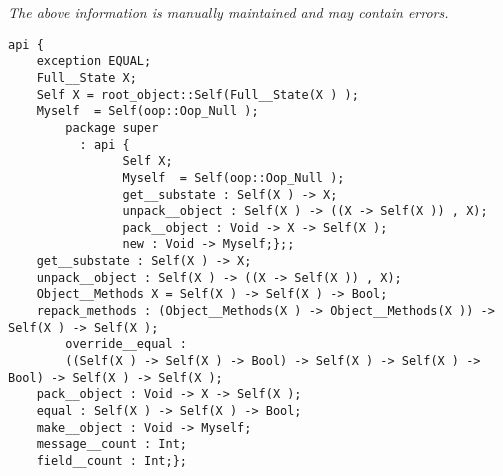 \label{api:Object2}

{\tiny \it The above information is manually maintained and may contain errors.}
\begin{verbatim}
api {
    exception EQUAL;
    Full__State X;
    Self X = root_object::Self(Full__State(X ) );
    Myself  = Self(oop::Oop_Null );
        package super
          : api {
                Self X;
                Myself  = Self(oop::Oop_Null );
                get__substate : Self(X ) -> X;
                unpack__object : Self(X ) -> ((X -> Self(X )) , X);
                pack__object : Void -> X -> Self(X );
                new : Void -> Myself;};;
    get__substate : Self(X ) -> X;
    unpack__object : Self(X ) -> ((X -> Self(X )) , X);
    Object__Methods X = Self(X ) -> Self(X ) -> Bool;
    repack_methods : (Object__Methods(X ) -> Object__Methods(X )) -> Self(X ) -> Self(X );
        override__equal :
        ((Self(X ) -> Self(X ) -> Bool) -> Self(X ) -> Self(X ) -> Bool) -> Self(X ) -> Self(X );
    pack__object : Void -> X -> Self(X );
    equal : Self(X ) -> Self(X ) -> Bool;
    make__object : Void -> Myself;
    message__count : Int;
    field__count : Int;};
\end{verbatim}
